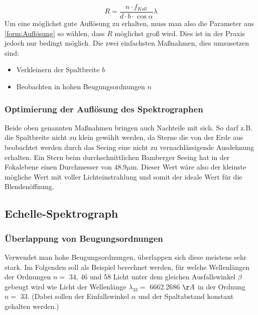 \begin{equation}
R = \frac{n \cdot f_{Koll}}{d \cdot b \cdot \cos \alpha} \lambda
\label{form:Auflösung}
\end{equation}
Um eine möglichst gute Auflösung zu erhalten, muss man also die Parameter aus \eqref{form:Auflösung} so wählen, dass $ R $ möglichst groß wird. Dies ist in der Praxis jedoch nur bedingt möglich. Die zwei einfachsten Maßnahmen, dies umzusetzen sind:

\begin{itemize}

\item Verkleinern der Spaltbreite $ b $

\item Beobachten in hohen Beugungsordnungen $ n $

\end{itemize}

\subsubsection{Optimierung der Auflösung des Spektrographen}
Beide oben genannten Maßnahmen bringen auch Nachteile mit sich. So darf z.B. die Spaltbreite nicht zu klein gewählt werden, da Sterne die von der Erde aus beobachtet werden durch das Seeing eine nicht zu vernachlässigende Ausdehnung erhalten. Ein Stern beim durchschnittlichen Bamberger Seeing hat in der Fokalebene einen Durchmesser von $48.9 \mu \mathrm{m} $. Dieser Wert wäre also der kleinste mögliche Wert mit voller Lichteinstrahlung und somit der ideale Wert für die Blendenöffnung.

\newpage

\subsection{Echelle-Spektrograph}
\subsubsection{Überlappung von Beugungsordnungen}
Verwendet man hohe Beugungsordnungen, überlappen sich diese meistens sehr stark. Im Folgenden soll als Beispiel berechnet werden, für welche Wellenlängen der Ordnungen $ n = $ 34, 46 und 58 Licht unter dem gleichen Ausfallswinkel  $ \beta $ gebeugt wird wie Licht der Wellenlänge $ \lambda_{33} = $ 6662.2686 $ \AA $ in der Ordnung $ n = $ 33. (Dabei sollen der Einfallswinkel $ \alpha $ und der Spaltabstand konstant gehalten werden.)\\

